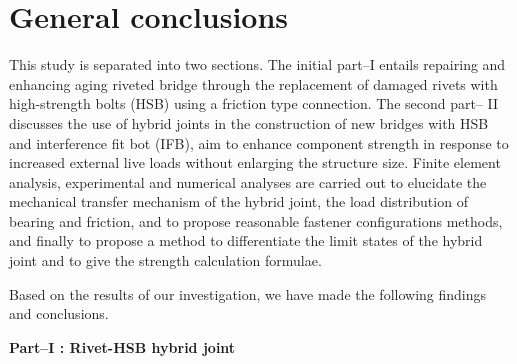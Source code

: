 \label{Conclusions} %



\section*{General conclusions}

This study is separated into two sections. The initial part--\RN{1} entails repairing and enhancing aging riveted bridge through the replacement of damaged rivets with high-strength bolts (HSB) using a friction type connection. The second part-- \RN{2} discusses the use of hybrid joints in the construction of new bridges with HSB and interference fit bot (IFB), aim to enhance component strength in response to increased external live loads without enlarging the structure size. Finite element analysis, experimental and numerical analyses are carried out to elucidate the mechanical transfer mechanism of the hybrid joint, the load distribution of bearing and friction, and to propose reasonable fastener configurations methods, and finally to propose a method to differentiate the limit states of the hybrid joint and to give the strength calculation formulae.

Based on the results of our investigation, we have made the following findings and conclusions. \par

\textbf{Part--\RN{1} : Rivet-HSB hybrid joint}

